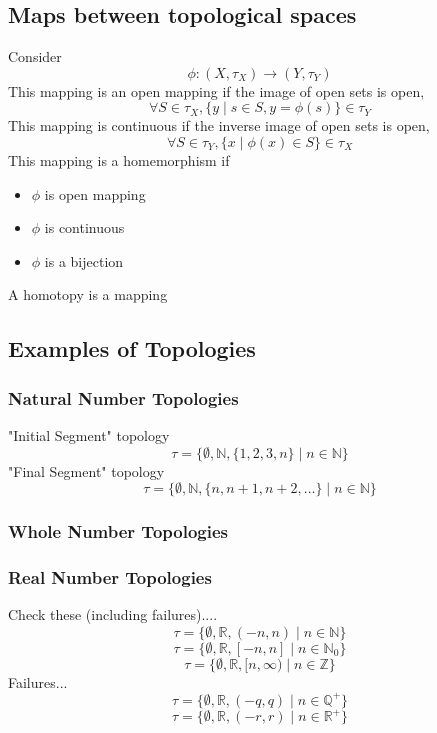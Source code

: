 \documentclass[a4paper]{scrartcl}
\begin{document}
\subsection{Maps between topological spaces}
Consider
$$\phi\colon(X,\tau_{X})\rightarrow (Y,\tau_{Y})$$
This mapping is an open mapping if the image of open sets is open,
$$\forall S\in\tau_{X}, \{y \mid s\in S, y = \phi(s)\} \in \tau_{Y}$$
This mapping is continuous if the inverse image of open sets is open,
$$\forall S\in\tau_{Y}, \{x \mid \phi(x)\in S\} \in \tau_{X}$$
This mapping is a homemorphism if
\begin{itemize}
\item{$\phi$ is open mapping}
\item{$\phi$ is continuous}
\item{$\phi$ is a bijection}
\end{itemize}

A homotopy is a mapping



\subsection{Examples of Topologies}
\subsubsection{Natural Number Topologies}
"Initial Segment" topology
$$\tau = \{\emptyset, \mathbb{N}, \{1, 2, 3, n\} \mid n\in \mathbb{N}\}$$
"Final Segment" topology
$$\tau = \{\emptyset, \mathbb{N}, \{n, n+1, n+2, \ldots\} \mid n\in \mathbb{N}\}$$

\subsubsection{Whole Number Topologies}
\subsubsection{Real Number Topologies}
Check these (including failures)....
$$\tau = \{\emptyset, \mathbb{R}, (-n, n) \mid n\in \mathbb{N}\}$$
$$\tau = \{\emptyset, \mathbb{R}, [-n, n] \mid n\in \mathbb{N}_{0}\}$$
$$\tau = \{\emptyset, \mathbb{R}, [n, \infty) \mid n\in \mathbb{Z}\}$$
Failures...
$$\tau = \{\emptyset, \mathbb{R}, (-q, q) \mid n\in \mathbb{Q}^{+}\}$$
$$\tau = \{\emptyset, \mathbb{R}, (-r, r) \mid n\in \mathbb{R}^{+}\}$$
\end{document}
